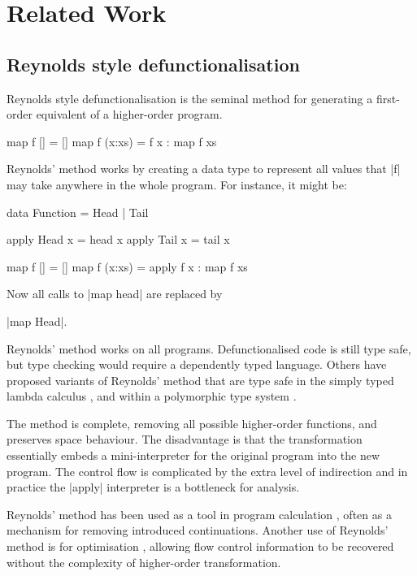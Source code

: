 \section{Related Work}
\label{secF:related}

\subsection{Reynolds style defunctionalisation}

Reynolds style defunctionalisation \cite{reynolds:defunc} is the seminal method for generating a first-order equivalent of a higher-order program.

\begin{example}
\begin{code}
map f []     = []
map f (x:xs) = f x : map f xs
\end{code}

\noindent Reynolds' method works by creating a data type to represent all values that |f| may take anywhere in the whole program. For instance, it might be:

\ignore\begin{code}
data Function = Head | Tail

apply Head  x = head  x
apply Tail  x = tail  x

map f []     = []
map f (x:xs) = apply f x : map f xs
\end{code}

\noindent Now all calls to |map head| are replaced by \ignore|map Head|.
\end{example}

Reynolds' method works on all programs. Defunctionalised code is still type safe, but type checking would require a dependently typed language. Others have proposed variants of Reynolds' method that are type safe in the simply typed lambda calculus \cite{bell:type_driven_defunctionalization}, and within a polymorphic type system \cite{pottier:polymorhpic_typed_defunctionaization}.

The method is complete, removing all possible higher-order functions, and preserves space behaviour. The disadvantage is that the transformation essentially embeds a mini-interpreter for the original program into the new program. The control flow is complicated by the extra level of indirection and in practice the |apply| interpreter is a bottleneck for analysis.

Reynolds' method has been used as a tool in program calculation \cite{danvy:defunctionalization_at_work,hutton:calculating_an_exceptional_machine}, often as a mechanism for removing introduced continuations. Another use of Reynolds' method is for optimisation \cite{grin,jhc}, allowing flow control information to be recovered without the complexity of higher-order transformation.

